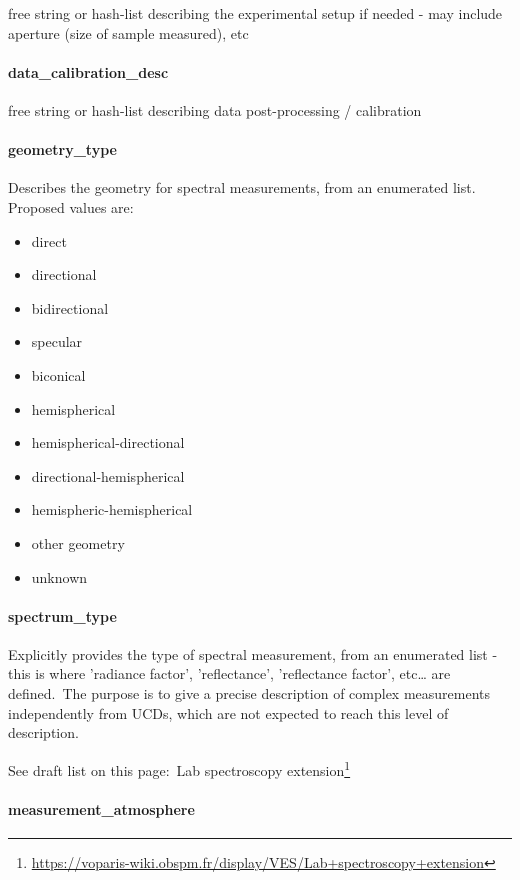 \documentclass[11pt,a4paper]{ivoa}
\begin{document}
free string or hash-list describing the experimental setup if needed - may include aperture (size of sample measured), etc

\paragraph{data\_calibration\_desc}

free string or hash-list describing data post-processing / calibration

\paragraph{geometry\_type}

Describes the geometry for spectral measurements, from an enumerated list. Proposed values are:

\begin{itemize}
\item direct
\item directional
\item bidirectional
\item specular
\item biconical
\item hemispherical
\item hemispherical-directional
\item directional-hemispherical
\item hemispheric-hemispherical
\item other geometry
\item unknown
\end{itemize}

\paragraph{spectrum\_type}

Explicitly provides the type of spectral measurement, from an enumerated list - this is where 'radiance factor', 'reflectance', 'reflectance factor', etc… are defined. The purpose is to give a precise description of complex measurements independently from UCDs, which are not expected to reach this level of description.

See draft list on this page: Lab spectroscopy extension\footnote{\url{https://voparis-wiki.obspm.fr/display/VES/Lab+spectroscopy+extension}}

\paragraph{measurement\_atmosphere}
\end{document}
